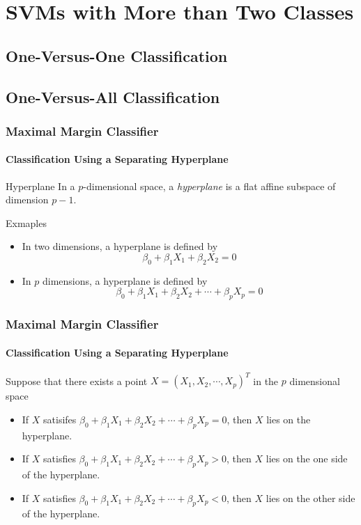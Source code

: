\documentclass{beamer}
\begin{document}
\section{SVMs with More than Two Classes}
\subsection{One-Versus-One Classification}
\subsection{One-Versus-All Classification}


\begin{frame}
    \frametitle{Maximal Margin Classifier}
    \framesubtitle{Classification Using a Separating Hyperplane}
    \begin{block}{Hyperplane}
        In a $p$-dimensional space, a \textit{hyperplane} is a flat affine subspace 
        of dimension $p-1$.
    \end{block}

    \begin{block}{Exmaples}
        \begin{itemize}
            \item In two dimensions, a hyperplane is defined by 
            \[\beta_0 + \beta_1 X_1 + \beta_2 X_2 =0 \] 
            \item In $p$ dimensions, a hyperplane is defined by 
            \[\beta_0+\beta_1 X_1 + \beta_2 X_2 + \cdots +\beta_pX_p=0 \] 
        \end{itemize}
    \end{block}
\end{frame}



\begin{frame}
    \frametitle{Maximal Margin Classifier}
    \framesubtitle{Classification Using a Separating Hyperplane}
    Suppose that there exists a point $X=(X_1,X_2,\cdots,X_p)^T$ in the $p$ dimensional space
    \begin{itemize}
        \item If $X$ satisifes $\beta_0+\beta_1 X_1 + \beta_2 X_2 + \cdots +\beta_pX_p=0$, 
        then $X$ lies on the hyperplane.
        \item If $X$ satisfies $\beta_0+\beta_1 X_1 + \beta_2 X_2 + \cdots +\beta_pX_p>0$, 
        then $X$ lies on the one side of the hyperplane.
        \item If $X$ satisfies $\beta_0+\beta_1 X_1 + \beta_2 X_2 + \cdots +\beta_pX_p<0$, 
        then $X$ lies on the other side of the hyperplane.
    \end{itemize}
\end{frame}
\end{document}

